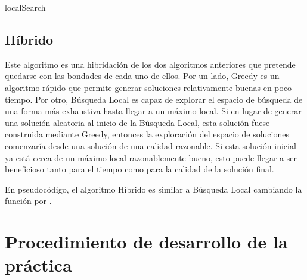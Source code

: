 \documentclass[10pt,a4paper]{article}
\begin{document}
\begin{algorithm}
	\caption{localSearch}
\end{algorithm}





\subsection{Híbrido}

Este algoritmo es una hibridación de los dos algoritmos anteriores que pretende quedarse con las bondades de cada uno de ellos. Por un lado, Greedy es un algoritmo rápido que permite generar soluciones relativamente buenas en poco tiempo. Por otro, Búsqueda Local es capaz de explorar el espacio de búsqueda de una forma más exhaustiva hasta llegar a un máximo local. Si en lugar de generar una solución aleatoria al inicio de la Búsqueda Local, esta solución fuese construida mediante Greedy, entonces la exploración del espacio de soluciones comenzaría desde una solución de una calidad razonable. Si esta solución inicial ya está cerca de un máximo local razonablemente bueno, esto puede llegar a ser beneficioso tanto para el tiempo como para la calidad de la solución final.

En pseudocódigo, el algoritmo Híbrido es similar a Búsqueda Local cambiando la función  por .










\section{Procedimiento de desarrollo de la práctica}
\end{document}
